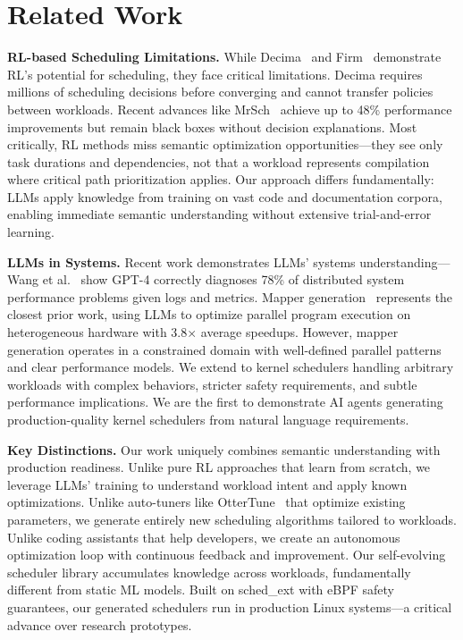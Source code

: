 \section{Related Work}

\textbf{RL-based Scheduling Limitations.} While Decima~\cite{mao2019decima} and Firm~\cite{qiu2020firm} demonstrate RL's potential for scheduling, they face critical limitations. Decima requires millions of scheduling decisions before converging and cannot transfer policies between workloads. Recent advances like MrSch~\cite{zhang2024mrsch} achieve up to 48\% performance improvements but remain black boxes without decision explanations. Most critically, RL methods miss semantic optimization opportunities—they see only task durations and dependencies, not that a workload represents compilation where critical path prioritization applies. Our approach differs fundamentally: LLMs apply knowledge from training on vast code and documentation corpora, enabling immediate semantic understanding without extensive trial-and-error learning.

\textbf{LLMs in Systems.} Recent work demonstrates LLMs' systems understanding—Wang et al.~\cite{wang2024llmsys} show GPT-4 correctly diagnoses 78\% of distributed system performance problems given logs and metrics. Mapper generation~\cite{wei2024mapper} represents the closest prior work, using LLMs to optimize parallel program execution on heterogeneous hardware with 3.8× average speedups. However, mapper generation operates in a constrained domain with well-defined parallel patterns and clear performance models. We extend to kernel schedulers handling arbitrary workloads with complex behaviors, stricter safety requirements, and subtle performance implications. We are the first to demonstrate AI agents generating production-quality kernel schedulers from natural language requirements.

\textbf{Key Distinctions.} Our work uniquely combines semantic understanding with production readiness. Unlike pure RL approaches that learn from scratch, we leverage LLMs' training to understand workload intent and apply known optimizations. Unlike auto-tuners like OtterTune~\cite{vanaken2017ottertune} that optimize existing parameters, we generate entirely new scheduling algorithms tailored to workloads. Unlike coding assistants that help developers, we create an autonomous optimization loop with continuous feedback and improvement. Our self-evolving scheduler library accumulates knowledge across workloads, fundamentally different from static ML models. Built on sched\_ext with eBPF safety guarantees, our generated schedulers run in production Linux systems—a critical advance over research prototypes.
